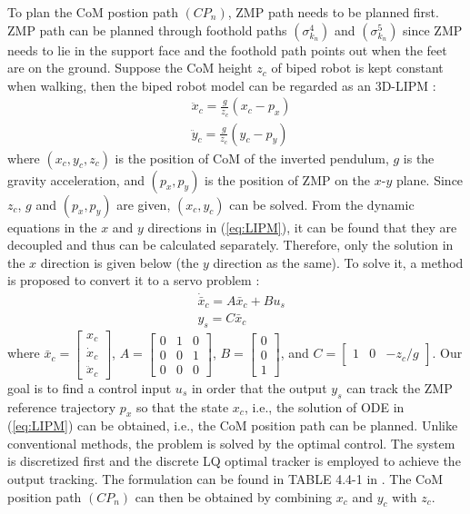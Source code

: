 \documentclass{ieeeaccess}
\begin{document}
To plan the CoM postion path $(CP_n)$, ZMP path needs to be planned first. ZMP path can be planned through foothold paths $(\sigma^{4}_{k_n})$ and $(\sigma^{5}_{k_n})$ since ZMP needs to lie in the support face and the foothold path points out when the feet are on the ground. Suppose the CoM height $z_c$ of biped robot is kept constant when walking, then the biped robot model can be regarded as an 3D-LIPM \cite{kajita2001real}:
\begin{equation} \label{eq:LIPM}
    \begin{split}
        & \ddot{x}_c = \frac{g}{z_c}(x_c - p_x) \\
        & \ddot{y}_c = \frac{g}{z_c}(y_c - p_y)
    \end{split}
\end{equation}
where $(x_c, y_c, z_c)$ is the position of CoM of the inverted pendulum, $g$ is the gravity acceleration, and $(p_x,p_y)$ is the position of ZMP on the $x$-$y$ plane. Since $z_c$, $g$ and $(p_x,p_y)$ are given, $(x_c, y_c)$ can be solved. From the dynamic equations in the $x$ and $y$ directions in (\ref{eq:LIPM}), it can be found that they are decoupled and thus can be calculated separately. Therefore, only the solution in the $x$ direction is given below (the $y$ direction as the same). To solve it, a method is proposed to convert it to a servo problem \cite{1241826}:
\begin{equation} \label{eq:output tracking}
    \begin{split}
        & \dot{\bar{x}}_c = A\bar{x}_c + Bu_s \\
        & y_s = C\bar{x}_c
    \end{split}
\end{equation}
where $\bar{x}_c = \begin{bmatrix}
    x_c \\ \dot{x}_c \\ \ddot{x}_c
\end{bmatrix}$, $A = \begin{bmatrix}
    0 & 1 & 0 \\ 0 & 0 & 1 \\ 0 & 0 & 0
\end{bmatrix}$, $B = \begin{bmatrix}
    0 \\ 0 \\ 1
\end{bmatrix}$, and $C = \begin{bmatrix}
    1 & 0 & -z_c/g
\end{bmatrix}$. Our goal is to find a control input $u_s$ in order that the output $y_s$ can track the ZMP reference trajectory $p_x$ so that the state $x_c$, i.e., the solution of ODE in (\ref{eq:LIPM}) can be obtained, i.e., the CoM position path can be planned. Unlike conventional methods, the problem is solved by the optimal control. The system is discretized first and the discrete LQ optimal tracker is employed to achieve the output tracking. The formulation can be found in TABLE 4.4-1 in \cite{lewis2012optimal}. The CoM position path $(CP_n)$ can then be obtained by combining $x_c$ and $y_c$ with $z_c$.
\end{document}
